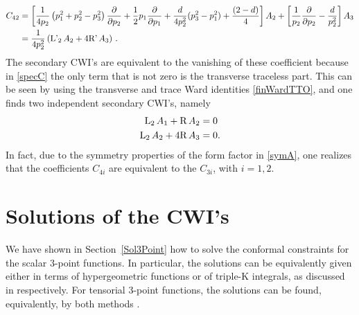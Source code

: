 \documentclass[a4paper,11pt,openright,twoside]{book}
\newcommand{\secref}[1]{Section~\ref{#1}}		%
\numberwithin{equation}{section}
\begin{document}
{{{\begin{align}
		C_{42}&= \left[  \frac{1}{4 p_2} \left( p_1^2 + p_2^2 - p_3^2 \right) \frac{\partial}{\partial p_2} + \frac{1}{2} p_1 \frac{\partial}{\partial p_1}  + \frac{d}{4 p_2^2} (p_3^2-p_1^2) + \frac{(2-d)}{4}  \right]A_2 + \left[\frac{1}{p_2} \frac{\partial}{\partial p_2}   - \frac{d}{p_2^2}  \right] A_3   \nonumber \\&= \frac{1}{4 p_2^2}\left( \textup{L'}_2\, A_2 + 4 \textup{R'}\, A_3 \right) \,.
	\end{align}
	The secondary CWI's are equivalent to the vanishing of these coefficient because in \eqref{specC} the only term that is not zero is the transverse traceless part. This can be seen  by using the transverse and trace Ward identities \eqref{finWardTTO}, and one finds two independent secondary CWI's, namely
	\begin{equation}
		\begin{split}
			\textup{L}_2\, A_1 + \textup{R}\, A_2&=0\\
			\textup{L}_2\, A_2 + 4 \textup{R}\, A_3&=0.
		\end{split}\label{secondary}
	\end{equation}
	In fact, due to the symmetry properties of the form factor in \eqref{symA}, one realizes that the coefficients $C_{4i}$ are equivalent to the $C_{3i}$, with $i=1,2$.


\section{Solutions of the CWI's}\label{solution}

We have shown in \secref{Sol3Point} how to solve the conformal constraints for the scalar $3$-point functions. In particular, the solutions can be equivalently given either in terms of hypergeometric functions or of triple-K integrals, as discussed in \cite{Coriano:2013jba, Bzowski:2013sza} respectively. For tensorial $3$-point functions, the solutions can be found, equivalently, by both methods  \cite{Bzowski:2013sza,Coriano:2018bsy,Coriano:2018bbe,Bzowski:2015pba}. 
}}}
\end{document}
